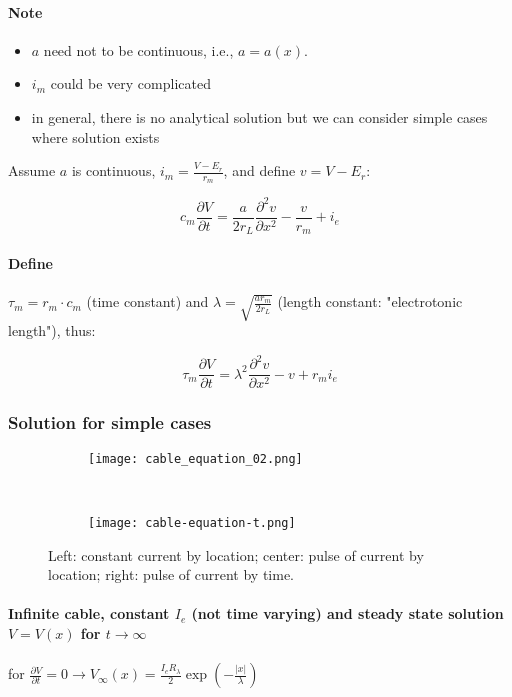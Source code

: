 \documentclass[main]{subfiles}
\begin{document}
\paragraph{Note}
\begin{itemize}
\item $a$ need not to be continuous, i.e., $a = a(x)$.
\item $i_m$ could be very complicated
\item in general, there is no analytical solution
\subitem but we can consider simple cases where solution exists
\end{itemize}

Assume $a$ is continuous, $i_m = \frac{V - E_r}{r_m}$, and define $v = V - E_r$:

\[c_m\frac{\partial V}{\partial t} = \frac{a}{2r_L}\frac{\partial^2 v}{\partial x^2}- \frac{v}{r_m} + i_e\]


\paragraph{Define}
$\tau_m = r_m \cdot c_m$ (time constant) and $\lambda = \sqrt{\frac{a r_m}{2 r_L}}$ (length constant: "electrotonic length"), thus:

\[\tau_m\frac{\partial V}{\partial t} = \lambda^2 \frac{\partial^2 v}{\partial x^2} - v + r_m i_e\]

\subsubsection{Solution for simple cases}

\begin{figure}[H]
	\centering
	\begin{subfigure}[b]{0.6\textwidth}
		\centering
		\texttt{[image: cable\_equation\_02.png]}
	\end{subfigure}%
	~
	\begin{subfigure}[b]{0.3\textwidth}
		\centering
		\texttt{[image: cable-equation-t.png]}
	\end{subfigure}
	\caption{Left: constant current by location; center: pulse of current by location; right: pulse of current by time.}
	\label{fig:cable-equation}
\end{figure}

\paragraph{Infinite cable, constant $I_e$ (not time varying) and steady state solution $V=V(x)$ for $t \to \infty$}
for $\frac{\partial V}{\partial t} = 0 \rightarrow V_\infty (x) = \frac{I_e R_\lambda}{2}\exp(-\frac{|x|}{\lambda})$
\end{document}

